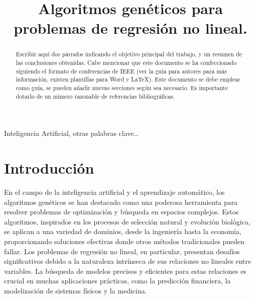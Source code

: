 \documentclass[conference,a4paper]{IEEEtran}
\begin{document}
\title{Algoritmos genéticos para problemas de regresión no lineal.}

\author{
  
  \and
  
}

\maketitle


\begin{abstract}
  Escribir aquí dos párrafos indicando el objetivo principal del trabajo, y un
  resumen de las conclusiones obtenidas. Cabe mencionar que este documento se
  ha confeccionado siguiendo el formato de conferencias de IEEE (ver la guía
  para autores para más información, existen plantillas para Word y \LaTeX).
  Este documento se debe emplear como guía, se pueden añadir nuevas secciones
  según sea necesario. Es importante dotarlo de un número razonable de
  referencias bibliográficas.
\end{abstract}


\begin{IEEEkeywords}
  Inteligencia Artificial, otras palabras clave…
\end{IEEEkeywords}


\section{Introducción}

En el campo de la inteligencia artificial y el aprendizaje automático, los algoritmos genéticos se han destacado como una poderosa herramienta para resolver problemas de optimización y búsqueda en espacios complejos. Estos algoritmos, inspirados en los procesos de selección natural y evolución biológica, se aplican a una variedad de dominios, desde la ingeniería hasta la economía, proporcionando soluciones efectivas donde otros métodos tradicionales pueden fallar. Los problemas de regresión no lineal, en particular, presentan desafíos significativos debido a la naturaleza intrínseca de sus relaciones no lineales entre variables. La búsqueda de modelos precisos y eficientes para estas relaciones es crucial en muchas aplicaciones prácticas, como la predicción financiera, la modelización de sistemas físicos y la medicina.
\end{document}
